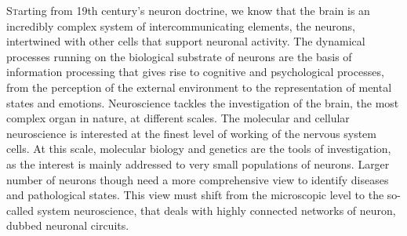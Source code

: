 
\bigbreak
\lettrine{S}{t}arting from 19th century’s neuron doctrine, we know that the brain is an incredibly complex system of intercommunicating elements, the neurons, intertwined with other cells that support neuronal activity. 
The dynamical processes running on the biological substrate of neurons are the basis of information processing that gives rise to cognitive and psychological processes, from the perception of the external environment to the representation of mental states and emotions.
Neuroscience tackles the investigation of the brain, the most complex organ in nature, at different scales. The molecular and cellular neuroscience is interested at the finest level of working of the nervous system cells. At this scale, molecular biology and genetics are the tools of investigation, as the interest is mainly addressed to very small populations of neurons. 
Larger number of neurons though need a more comprehensive view to identify diseases and pathological states. This view must shift from the microscopic level to the so-called system neuroscience, that deals with highly connected networks of neuron, dubbed neuronal circuits.

